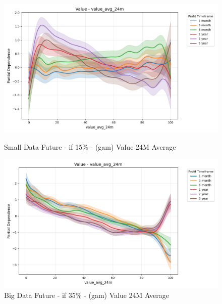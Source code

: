 \documentclass[11pt,english,a4paper,hidelinks]{book}
\begin{document}
\begin{figure}[H]
    \centering
    \begin{minipage}{0.48\textwidth}
        \centering
        \includegraphics[width=\textwidth]{images/code/models/general_regression/splines/2D/Small Data future - IF/value_value_avg_24m.png}
        \caption{Small Data Future - \acrshort{if} 15\% - (\acrshort{gam}) Value 24M Average}
        \label{fig:spline_value_value_avg_24m}
    \end{minipage}\hfill
    \begin{minipage}{0.48\textwidth}
        \centering
        \includegraphics[width=\textwidth]{images/code/models/general_regression/splines/2D/Big Data future - IF HARD Balanced/value_value_avg_24m.png}
        \caption{Big Data Future - \acrshort{if} 35\% - (\acrshort{gam}) Value 24M Average}
        \label{fig:spline_value_value_avg_24m_balanced}
    \end{minipage}
\end{figure}
\end{document}
